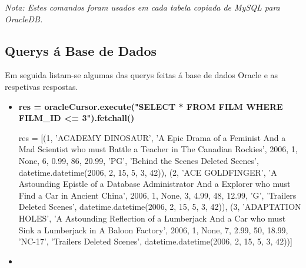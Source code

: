 \textit{Nota: Estes comandos foram usados em cada tabela copiada de MySQL para OracleDB.}

\subsection{Querys á Base de Dados}

Em seguida listam-se algumas das querys feitas á base de dados Oracle e as respetivas respostas.

\begin{itemize}
\item \textbf{res = oracleCursor.execute("SELECT * FROM FILM WHERE FILM\_ID <= 3").fetchall()}

res = [(1, 'ACADEMY DINOSAUR', 'A Epic Drama of a Feminist And a Mad Scientist who must Battle a Teacher in The Canadian Rockies', 2006, 1, None, 6, 0.99, 86, 20.99, 'PG', 'Behind the Scenes Deleted Scenes', datetime.datetime(2006, 2, 15, 5, 3, 42)), (2, 'ACE GOLDFINGER', 'A Astounding Epistle of a Database Administrator And a Explorer who must Find a Car in Ancient China', 2006, 1, None, 3, 4.99, 48, 12.99, 'G', 'Trailers Deleted Scenes', datetime.datetime(2006, 2, 15, 5, 3, 42)), (3, 'ADAPTATION HOLES', 'A Astounding Reflection of a Lumberjack And a Car who must Sink a Lumberjack in A Baloon Factory', 2006, 1, None, 7, 2.99, 50, 18.99, 'NC-17', 'Trailers Deleted Scenes', datetime.datetime(2006, 2, 15, 5, 3, 42))]
\item
\end{itemize}











